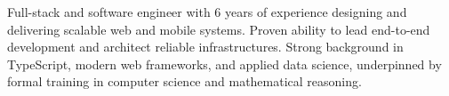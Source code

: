 \documentclass[11pt, a4paper]{awesome-cv}
\begin{document}
\makecvheader

\begin{cvparagraph}

Full-stack and software engineer with 6 years of experience designing and delivering scalable web and mobile systems. Proven ability to lead end-to-end development and architect reliable infrastructures. Strong background in TypeScript, modern web frameworks, and applied data science, underpinned by formal training in computer science and mathematical reasoning.
\end{cvparagraph}

\end{document}
